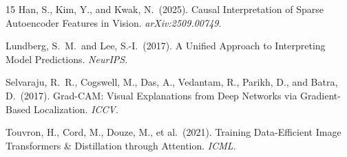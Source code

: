 \documentclass{article}
\begin{document}
\begin{thebibliography}{15}
Han, S., Kim, Y., and Kwak, N.\ (2025).
Causal Interpretation of Sparse Autoencoder Features in Vision.
\textit{arXiv:2509.00749}.

Lundberg, S.\ M.\ and Lee, S.-I.\ (2017).
A Unified Approach to Interpreting Model Predictions.
\textit{NeurIPS}.

Selvaraju, R.\ R., Cogswell, M., Das, A., Vedantam, R., Parikh, D., and Batra, D.\ (2017).
Grad-CAM: Visual Explanations from Deep Networks via Gradient-Based Localization.
\textit{ICCV}.

Touvron, H., Cord, M., Douze, M., et al.\ (2021).
Training Data-Efficient Image Transformers \& Distillation through Attention.
\textit{ICML}.

\end{thebibliography}
\end{document}
